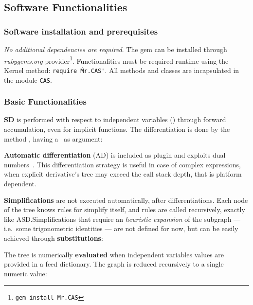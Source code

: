 \subsection{Software Functionalities}
\label{sec:functionalities}

\subsubsection{Software installation and prerequisites}

\emph{No additional dependencies are required}. The gem can be installed through \emph{rubygems.org} provider\footnote{\texttt{gem install Mr.CAS}}. Functionalities must be required runtime using the Kernel method: \texttt{require \'Mr.CAS\'}. All methods and classes are incapsulated in the module \texttt{CAS}.

\subsubsection{Basic Functionalities}
\textbf{SD} is performed with respect to independent variables (\CASVariable) through forward accumulation, even for implicit functions. The differentiation is done by the method \CASOpdiff, having a \CASVariable~as argument:

\noindent%


\textbf{Automatic differentiation} (AD) is included as plugin and exploits dual numbers~\cite{bartholomew2000automatic}. This differentiation strategy is useful in case of complex expressions, when explicit derivative's tree may exceed the call stack depth, that is platform dependent.

\textbf{Simplifications} are not executed automatically, after differentiations. Each node of the tree knows rules for simplify itself, and rules are called recursively, exactly like ASD.\@ Simplifications that require an \emph{heuristic expansion} of the subgraph --- i.e.\ some trigonometric identities --- are not defined for now, but can be easily achieved through \textbf{substitutions}:

\noindent%


The tree is numerically \textbf{evaluated} when independent variables values are provided in a feed dictionary. The graph is reduced recursively to a single numeric value:

